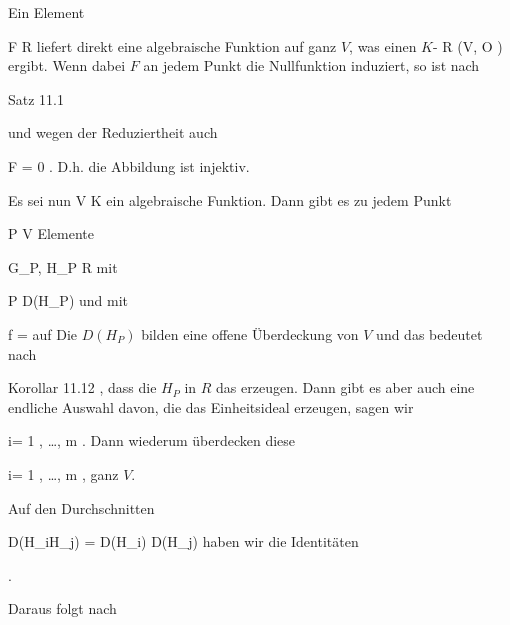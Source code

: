 {





Ein Element

\mavergleichskette
{\vergleichskette
{ F
}
{ \in }{ R
}
{  }{
}
{    }{
}
{   }{
}
}
{}{}{}
liefert direkt eine algebraische Funktion auf ganz $V$, was einen
$K$-
\maabbdisp {} { R } { \Gamma (V, {\mathcal O} )
} {}
ergibt. Wenn dabei $F$ an jedem Punkt die Nullfunktion induziert, so ist nach

Satz 11.1

und wegen der Reduziertheit auch

\mavergleichskette
{\vergleichskette
{ F
}
{ = }{ 0
}
{  }{
}
{    }{
}
{   }{
}
}
{}{}{.}
D.h. die Abbildung ist injektiv.

Es sei nun
 { V } { K
} {}
ein algebraische Funktion. Dann gibt es zu jedem Punkt

\mavergleichskette
{\vergleichskette
{ P
}
{ \in }{ V
}
{  }{
}
{    }{
}
{   }{
}
}
{}{}{}
Elemente

\mavergleichskette
{\vergleichskette
{ G_P, H_P
}
{ \in }{ R
}
{  }{
}
{    }{
}
{   }{
}
}
{}{}{}
mit

\mavergleichskette
{\vergleichskette
{ P
}
{ \in }{ D(H_P)
}
{  }{
}
{    }{
}
{   }{
}
}
{}{}{}
und mit

\mavergleichskette
{\vergleichskette
{ f
}
{ = }{ {  }
}
{  }{
}
{    }{
}
{   }{
}
}
{}{}{}
auf
 Die $D(H_P)$ bilden eine offene Überdeckung von $V$ und das bedeutet nach

Korollar 11.12
,
dass die $H_P$ in $R$ das
erzeugen. Dann gibt es aber auch eine endliche Auswahl davon, die das Einheitsideal erzeugen, sagen wir

 {}
 {i= 1 , \ldots ,  m} {}
 {} {} {} {.}
Dann wiederum überdecken diese

 {}
 {i= 1 , \ldots ,  m} {}
 {} {} {} {,}
ganz $V$.

Auf den Durchschnitten

\mavergleichskette
{\vergleichskette
{ D(H_iH_j)
}
{ = }{ D(H_i) \cap D(H_j)
}
{  }{
}
{    }{
}
{   }{
}
}
{}{}{}
haben wir die Identitäten

 { . }

Daraus folgt nach

}
